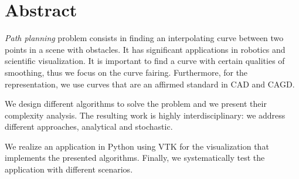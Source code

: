 \begingroup
\let\clearpage\relax
\let\cleardoublepage\relax
\let\cleardoublepage\relax

\chapter*{Abstract}
\emph{Path planning} problem consists in finding an interpolating curve
between two points in a scene with obstacles. It has significant
applications in robotics and scientific visualization. It is important to
find a curve with certain qualities of smoothing, thus we focus on the
curve fairing. Furthermore, for the representation, we use \bs curves
that are an affirmed standard in \ac{CAD} and \ac{CAGD}.

We design different algorithms to solve the problem and we present their
complexity analysis. The resulting work is highly interdisciplinary:
we address different approaches, analytical and stochastic.

We realize an application in
Python using \ac{VTK} for the visualization that implements the
presented algorithms. Finally, we systematically test the application
with different scenarios.
\endgroup			

\vfill


